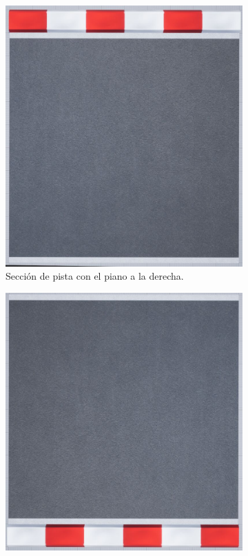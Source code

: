\begin{figure}[H]
    \centering
    \begin{subfigure}[t]{0.48\textwidth}
        \centering
        \includegraphics[width=\textwidth]{imagenes/converted/pista/track-final.jpg}
        \caption{Sección de pista con el piano a la derecha.}
        \label{fig:curvafinal2}
    \end{subfigure}
    \hfill
    \begin{subfigure}[t]{0.48\textwidth}
        \centering
        \includegraphics[width=\textwidth]{imagenes/converted/pista/track-final-inverted.jpg}

\end{subfigure}
\end{figure}

